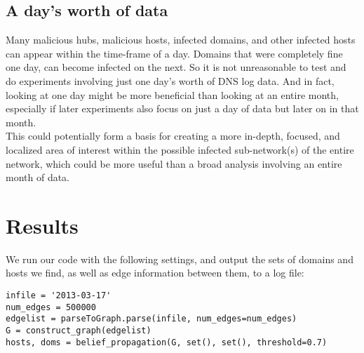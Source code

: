 \documentclass{article} %
\begin{document}
\subsection{A day's worth of data}
Many malicious hubs, malicious hosts, infected domains, and other infected hosts can appear within the time-frame of a day. Domains that were completely fine one day, can become infected on the next. So it is not unreasonable to test
and do experiments involving just one day's worth of DNS log data. And in fact, looking at one day might be more beneficial than looking at an entire month, especially if later experiments also focus on just a day of data but later on 
in that month. \\
This could potentially form a basis for creating a more in-depth, focused, and localized area of interest within the possible infected sub-network(s) of the entire network, which could be more useful than a broad analysis
involving an entire month of data.

\section{Results}
\label{res}

We run our code with the following settings, and output the sets of domains and hosts we find, as well as edge information between them, to a log file:
\begin{lstlisting}
infile = '2013-03-17'
num_edges = 500000
edgelist = parseToGraph.parse(infile, num_edges=num_edges)
G = construct_graph(edgelist)
hosts, doms = belief_propagation(G, set(), set(), threshold=0.7)
\end{lstlisting}
\end{document}
